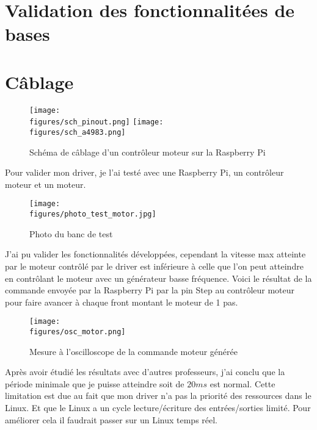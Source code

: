 \section{Validation des fonctionnalitées de bases}

\section{Câblage}
\begin{figure}[H]
    \centering
    \texttt{[image: \\figures/sch\_pinout.png]}
    \texttt{[image: \\figures/sch\_a4983.png]}
    \decoRule
    \caption[
    Schéma de câblage d'un contrôleur moteur sur la Raspberry Pi]{
    Schéma de câblage d'un contrôleur moteur sur la Raspberry Pi}
    \label{fig:Schéma de câblage d'un contrôleur moteur sur la Raspberry Pi}
    \end{figure}

\vspace{1cm}

Pour valider mon driver, je l’ai testé avec une Raspberry Pi, un contrôleur moteur et un moteur.

\begin{figure}[H]
    \centering
    \texttt{[image: \\figures/photo\_test\_motor.jpg]}
    \decoRule
    \caption[
    Photo du banc de test]{
	Photo du banc de test}
    \label{fig:Photo du banc de test}
    \end{figure}

\vspace{1cm}

J’ai pu valider les fonctionnalités développées, cependant la vitesse max atteinte par le moteur contrôlé par le driver est inférieure à celle que l'on peut atteindre en contrôlant le moteur avec un générateur basse fréquence.
Voici le résultat de la commande envoyée par la Raspberry Pi par la pin Step au contrôleur moteur pour faire avancer à chaque front montant le moteur de 1 pas.

\begin{figure}[H]
    \centering
    \texttt{[image: \\figures/osc\_motor.png]}
    \decoRule
    \caption[
    Mesure à l'oscilloscope de la commande moteur générée]{
	Mesure à l'oscilloscope de la commande moteur générée}
    \label{fig:Mesure à l'oscilloscope de la commande moteur générée}
    \end{figure}

\vspace{1cm}

Après avoir étudié les résultats avec d'autres professeurs, j'ai conclu que la période minimale que je puisse atteindre soit de $20ms$ est normal. Cette limitation est due au fait que mon driver n'a pas la priorité des ressources dans le Linux. Et que le Linux a un cycle lecture/écriture des entrées/sorties limité. Pour améliorer cela il faudrait passer sur un Linux temps réel.


